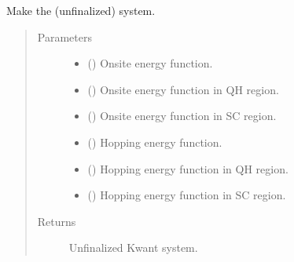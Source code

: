 \documentclass[letterpaper,10pt,english]{sphinxmanual}
\begin{document}
\begin{fulllineitems}
\begin{fulllineitems}
\label{\detokenize{modules:modules.system.DeviceSingleCorner.make_system}}
\pysigstartsignatures
{}
\pysigstopsignatures
\sphinxAtStartPar
Make the (unfinalized) system.
\begin{quote}\begin{description}
\item[{Parameters}] \leavevmode\begin{itemize}
\item {} 
\sphinxAtStartPar
{} () \textendash{} Onsite energy function.

\item {} 
\sphinxAtStartPar
{} () \textendash{} Onsite energy function in QH region.

\item {} 
\sphinxAtStartPar
{} () \textendash{} Onsite energy function in SC region.

\item {} 
\sphinxAtStartPar
{} () \textendash{} Hopping energy function.

\item {} 
\sphinxAtStartPar
{} () \textendash{} Hopping energy function in QH region.

\item {} 
\sphinxAtStartPar
{} () \textendash{} Hopping energy function in SC region.

\end{itemize}

\item[{Returns}] \leavevmode
\sphinxAtStartPar
Unfinalized Kwant system.

\end{description}\end{quote}

\end{fulllineitems}


\end{fulllineitems}
\end{document}
